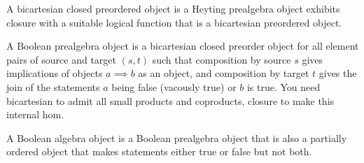 \begin{definition}
    \label{definition-bicartesian-closed-preordered-object}
    A bicartesian closed preordered object is a Heyting prealgebra object exhibits closure with a suitable logical function that is a bicartesian preordered object.
\end{definition}

\begin{definition}
    \label{definition-boolean-prealgebra-object}
    A Boolean prealgebra object is a bicartesian closed preorder object for all element pairs of source and target $(s,t)$ such that composition by source $s$ gives implications of objects $a \implies b$ as an object, and composition by target $t$ gives the join of the statements $a$ being false (vacously true) or $b$ is true. You need bicartesian to admit all small products and coproducts, closure to make this internal hom.
\end{definition}

\begin{definition}
    \label{definition-boolean-algebra-object}
    A Boolean algebra object is a Boolean prealgebra object that is also a partially ordered object that makes statements either true or false but not both.
\end{definition}